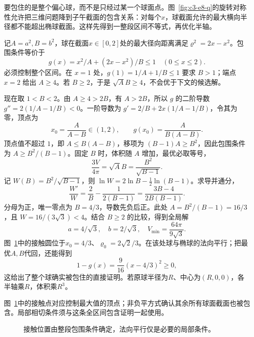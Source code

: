 \begin{solution}
要包住的是整个偏心球，而不是只经过某一个球面点。图~\ref{fig:c3-e8-q}的旋转对称性允许把三维问题降到子午截面的包含关系：对每个$x$，球截面允许的最大横向半径都不能超出椭球截面。这样先得到一整段区间不等式，再优化半轴。


记$A=a^2,B=b^2$，球在截面$x\in[0,2]$处的最大径向距离满足$\varrho^2=2x-x^2$。包围条件等价于
\[g(x)=x^2/A+(2x-x^2)/B\le1\quad(0\le x\le2).
\]
必须控制整个区间。在 $x=1$ 处，$g(1)=1/A+1/B\le1$ 要求 $B>1$；端点 $x=2$ 给出 $A\ge4$。若 $B\ge2$，于是 $\sqrt A B\ge4$，不会优于下文的候选解。

现在取 $1<B<2$。由 $A\ge4>2B$，有 $A>2B$，所以 $g$ 的二阶导数 $g''=2(1/A-1/B)<0$。一阶导数为 $g'=2/B+2x(1/A-1/B)$，令其为零，顶点为
\[x_0=\frac A{A-B}\in(1,2),\qquad
 g(x_0)=\frac A{B(A-B)}.
\]
顶点值不超过 $1$，即 $A\le B(A-B)$，移项为 $(B-1)A\ge B^2$，因此包围条件为 $A\ge B^2/(B-1)$。固定 $B$ 时，体积随 $A$ 增加，最优必取等号，
\[\frac{3V}{4\pi}=\sqrt A B=\frac{B^2}{\sqrt{B-1}}.
\]
记 $W(B)=B^2/\sqrt{B-1}$，则 $\ln W=2\ln B-\tfrac12\ln(B-1)$。求导并通分，
\[
\frac{W'}W=\frac2B-\frac1{2(B-1)}=\frac{3B-4}{2B(B-1)}.
\]
分母为正，唯一零点为 $B=4/3$，导数先负后正。此处 $A=B^2/(B-1)=16/3$，且 $W=16/(3\sqrt3)<4$。结合 $B\ge2$ 的比较，得到全局解
\[\boxed{a=4/\sqrt3,\quad b=2/\sqrt3,\quad
V_{\min}=\frac{64\pi}{9\sqrt3}}.\]
图~\ref{fig:c3-e8-s}中的接触圆位于$x_0=4/3$、$\varrho_0=2\sqrt2/3$。在该处球与椭球的法向平行；把最优$A,B$代回，还能得到
\[1-g(x)=\frac9{16}(x-4/3)^2\ge0,
\]
这给出了整个球确实被包住的直接证明。若原球半径为$R$、中心为$(R,0,0)$，各半轴乘$R$，体积乘$R^3$。


图~\ref{fig:c3-e8-s}中的接触点对应控制最大值的顶点；非负平方式确认其余所有球面截面也被包含。局部相切条件须与这条全区间包含证明一起使用。

\begin{figure}[H]\centering
{}
\caption{接触位置由整段包围条件确定，法向平行仅是必要的局部条件。}\label{fig:c3-e8-s}
\end{figure}
\end{solution}

